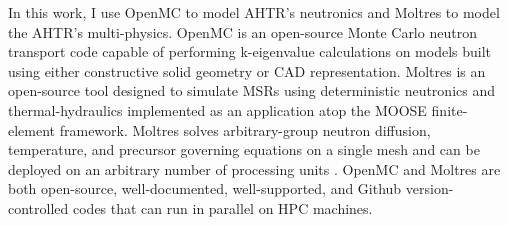 In this work, I use OpenMC \cite{romano_openmc:_2015} to model \gls{AHTR}'s neutronics 
and Moltres \cite{lindsay_introduction_2018} to model the \gls{AHTR}'s multi-physics. 
OpenMC is an open-source Monte Carlo neutron transport code capable of 
performing k-eigenvalue calculations on models built using either constructive 
solid geometry or CAD representation. 
Moltres is an open-source tool designed to simulate \glspl{MSR} using 
deterministic neutronics and thermal-hydraulics implemented as an application 
atop the \gls{MOOSE} finite-element framework.  
Moltres solves arbitrary-group neutron diffusion, temperature, and precursor 
governing equations on a single mesh and can be deployed on an arbitrary number 
of processing units \cite{lindsay_introduction_2018}.
OpenMC and Moltres are both open-source, well-documented, well-supported, and 
Github version-controlled codes that can run in parallel on \gls{HPC} machines.

